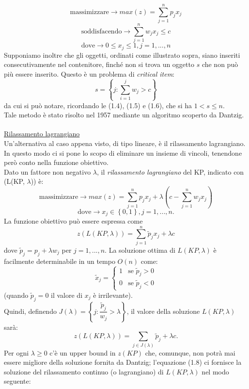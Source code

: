 \documentclass[12pt,a4paper,openright,twoside]{report}
\begin{document}
$$\mbox{massimizzare} \longrightarrow max(z) = \sum^{n}_{j=1}p_{j}x_{j}$$
$$\mbox{soddisfacendo} \longrightarrow \sum^{n}_{j=1}w_{j}x_{j} \leq c$$
$$\mbox{dove} \longrightarrow 0 \leq x_{j} \leq 1 , j = 1,...,n$$ 
Supponiamo inoltre che gli oggetti, ordinati come illustrato sopra, siano inseriti consecutivamente nel contenitore, finch\'{e} non si trova un oggetto $s$ che non pu\`{o} pi\`{u} essere inserito. Questo \`{e} un problema di \textit{critical item}:
$$s = \left\lbrace j : \sum^{j}_{i=1} w_{j} > c \right\rbrace$$ 
da cui si pu\`{o} notare, ricordando le (1.4), (1.5) e (1.6), che si ha $1 < s \leq n$.\\
Tale metodo \`{e} stato risolto nel 1957 mediante un algoritmo scoperto da Dantzig.\\
\\
\underline{Rilassamento lagrangiano}\\
Un'alternativa al caso appena visto, di tipo lineare, \`{e} il rilassamento lagrangiano. In questo modo ci si pone lo scopo di eliminare un insieme di vincoli, tenendone per\`{o} conto nella funzione obiettivo.\\
Dato un fattore non negativo $\lambda$, il \textit{rilassamento lagrangiano} del KP, indicato con (L(KP, $\lambda$)) \`{e}:
$$\mbox{massimizzare} \longrightarrow max(z) = \sum^{n}_{j=1}p_{j}x_{j} + \lambda (c - \sum^{n}_{j=1} w_{j}x_{j})$$
$$\mbox{dove} \longrightarrow x_{j} \in \left\lbrace 0,1\right\rbrace , j = 1,...,n.$$
La funzione obiettivo pu\`{o} essere espressa come
\begin{equation}\label{eq7}
z(L(KP, \lambda)) = \sum^{n}_{j=1}\tilde{p}_{j}x_{j} + \lambda c
\end{equation} 
dove $\tilde{p}_{j} = p_{j} + \lambda w_{j}$ per $j=1,...,n$. La soluzione ottima di $L(KP,\lambda)$ \`{e} facilmente determinabile in un tempo $O(n)$ come:
\begin{equation}\label{eq8}
\tilde{x}_{j} =
\left\{
\begin{array}{rl}
1 & \mbox{se } \tilde{p}_{j}>0 \\
0 & \mbox{se } \tilde{p}_{j}<0
\end{array}
\right.
\end{equation}
(quando $\tilde{p}_{j} = 0$ il valore di $x_{j}$ \`{e} irrilevante).\\
Quindi, definendo $ J(\lambda)= \left\lbrace j : \dfrac{\tilde{p}_{j}}{w_{j}} > \lambda \right\rbrace $, il valore della soluzione $L(KP, \lambda)$ sar\`{a}:
$$z(L(KP, \lambda)) = \sum_{j \in J(\lambda)}\tilde{p}_{j} + \lambda c.$$
Per ogni $\lambda \geq 0$ c'\`{e} un upper bound in $z(KP)$ che, comunque, non potr\`{a} mai essere migliore della soluzione fornita da Dantzig; l'equazione (1.8) ci fornisce la soluzione del rilassamento continuo (o lagrangiano) di $L(KP, \lambda)$ nel modo seguente:
\end{document}
